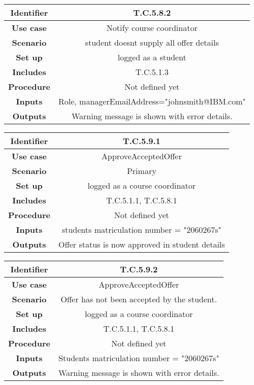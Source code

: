 \begin{tabular}{|c|c|}
\hline \textbf{Identifier} & T.C.5.8.2\\
\hline \textbf{Use case} & Notify course coordinator\\
\hline \textbf{Scenario} & student doesnt supply all offer details\\
\hline \textbf{Set up} & logged as a student\\
\hline \textbf{Includes} & T.C.5.1.3\\
\hline \textbf{Procedure} & Not defined yet\\
\hline \textbf{Inputs} & Role, managerEmailAddress="johnsmith@IBM.com"\\
\hline \textbf{Outputs} & Warning message is shown with error details.\\
\hline
\end{tabular}

\begin{tabular}{|c|c|}
\hline \textbf{Identifier} & T.C.5.9.1\\
\hline \textbf{Use case} & ApproveAcceptedOffer\\
\hline \textbf{Scenario} & Primary\\
\hline \textbf{Set up} & logged as a course coordinator\\
\hline \textbf{Includes} & T.C.5.1.1, T.C.5.8.1\\
\hline \textbf{Procedure} & Not defined yet\\
\hline \textbf{Inputs} & students matriculation number = "2060267s"\\
\hline \textbf{Outputs} & Offer status is now approved in student details\\
\hline
\end{tabular}

\begin{tabular}{|c|c|}
\hline \textbf{Identifier} & T.C.5.9.2\\
\hline \textbf{Use case} & ApproveAcceptedOffer\\
\hline \textbf{Scenario} & Offer has not been accepted by the student.\\
\hline \textbf{Set up} & logged as a course coordinator\\
\hline \textbf{Includes} & T.C.5.1.1, T.C.5.8.1\\
\hline \textbf{Procedure} & Not defined yet\\
\hline \textbf{Inputs} & Students matriculation number = "2060267s"\\
\hline \textbf{Outputs} & Warning message is shown with error details.\\
\hline
\end{tabular}


